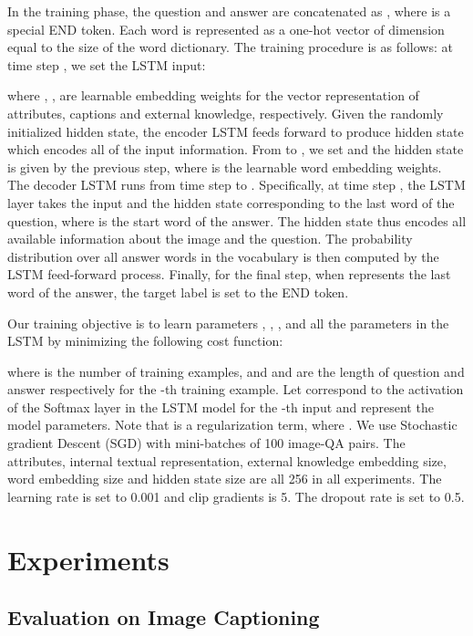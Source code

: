 \documentclass[10pt,journal,compsoc]{IEEEtran}
\begin{document}
In the training phase, the question  and answer  are concatenated as , where  is a special END token. Each word is represented as a one-hot vector of dimension equal to the size of the word dictionary. The training procedure is as follows: at time step , we set the LSTM input: 

where , ,  are learnable embedding weights for the vector representation of attributes, captions and external knowledge, respectively. Given the randomly initialized hidden state, the encoder LSTM feeds forward to produce  hidden state  which encodes all of the input information. From  to , we set  and the hidden state  is given by the previous step, where  is the learnable word embedding weights. The decoder LSTM runs from time step  to . Specifically, at time step , the LSTM layer takes the input  and the hidden state  corresponding to the last word of the question, where  is the start word of the answer. The hidden state  thus encodes all available information about the image and the question. The probability distribution  over all answer words in the vocabulary is then computed by the LSTM feed-forward process. Finally, for the final step, when  represents the last word of the answer, the target label is set to the END token.

Our training objective is to learn parameters , , ,  and all the parameters in the LSTM by minimizing the following cost function:

where  is the number of training examples, and  and  are the length of question and answer respectively for the -th training example. Let  correspond to the activation of the Softmax layer in the LSTM model for the -th input and  represent the model parameters. Note that  is a regularization term, where . We use Stochastic gradient Descent (SGD) with mini-batches of 100 image-QA pairs. The attributes, internal textual representation, external knowledge embedding size, word embedding size and hidden state size are all 256 in all experiments. The learning rate is set to 0.001 and clip gradients is 5. The dropout rate is set to 0.5.
 
\section{Experiments}
\label{sec:exp}


\subsection{Evaluation on Image Captioning}
\end{document}

